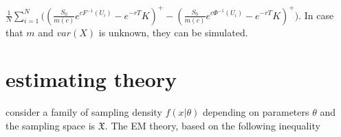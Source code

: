 \documentclass[11pt,a4paper]{article}
\begin{document}
$ \frac{1}{N}\sum_{i=1}^N{((\frac{S_0}{m(c)}e^{cF^{-1}(U_i)}-e^{-rT}K)^+-(\frac{S_0}{m(c)}e^{c\Phi^{-1}(U_i)}-e^{-rT}K)^+}) $. In case that $ m $ and $ var(X) $ is unknown, they can be simulated.



\section{ estimating theory}
consider a family of sampling density $f(x|\theta)$ depending on parameters $\theta$ and the sampling space is $\mathfrak{X}$. 
The EM theory, based on the following inequality
\end{document}
